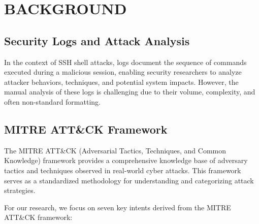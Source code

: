

\section{BACKGROUND}


    \subsection{Security Logs and Attack Analysis}
    

        In the context of SSH shell attacks, logs document the sequence of commands executed during a malicious session, enabling security researchers to analyze attacker behaviors, techniques, and potential system impacts. However, the manual analysis of these logs is challenging due to their volume, complexity, and often non-standard formatting.

    \subsection{MITRE ATT\&CK Framework}
    
        The MITRE ATT\&CK (Adversarial Tactics, Techniques, and Common Knowledge) framework provides a comprehensive knowledge base of adversary tactics and techniques observed in real-world cyber attacks. This framework serves as a standardized methodology for understanding and categorizing attack strategies.

        \noindent For our research, we focus on seven key intents derived from the MITRE ATT\&CK framework:

